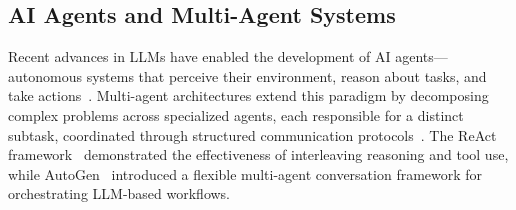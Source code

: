 \documentclass[twoside,twocolumn,10pt]{article}
\begin{document}
\begin{table}[htbp]
\centering
\caption{Feature comparison of existing DBaaS platforms and the proposed system.}
\label{tab:dbaas_comparison}
\renewcommand{\arraystretch}{1.2}
\setlength{\tabcolsep}{4pt}
\end{table}

\subsection{AI Agents and Multi-Agent Systems}

Recent advances in LLMs have enabled the development of AI agents---autonomous systems that perceive their environment, reason about tasks, and take actions~\cite{AI_Agents_Evolution}. Multi-agent architectures extend this paradigm by decomposing complex problems across specialized agents, each responsible for a distinct subtask, coordinated through structured communication protocols~\cite{autogen, yao22}. The ReAct framework~\cite{yao22} demonstrated the effectiveness of interleaving reasoning and tool use, while AutoGen~\cite{autogen} introduced a flexible multi-agent conversation framework for orchestrating LLM-based workflows.
\end{document}
